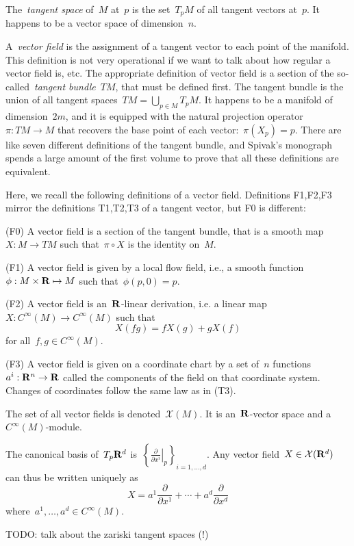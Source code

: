 The~\emph{tangent space} of~$M$ at~$p$ is the set~$T_pM$ of all tangent
vectors at~$p$.  It happens to be a vector space of dimension~$n$.

A~\emph{vector field} is the assignment of a tangent vector to each point of
the manifold.  This definition is not very operational if we want to talk
about how regular a vector field is, etc.  The appropriate definition of
vector field is a section of the so-called~\emph{tangent bundle}~$TM$, that
must be defined first.  The tangent bundle is the union of all tangent
spaces~$TM=\bigcup_{p\in M}T_pM$.  It happens to be a manifold of
dimension~$2m$, and it is equipped with the natural projection
operator~$\pi:TM\to M$ that recovers the base point of each
vector:~$\pi\left(X_p\right)=p$.  There are like seven different definitions
of the tangent bundle, and Spivak's monograph spends a large amount of the
first volume to prove that all these definitions are equivalent.

Here, we recall the following definitions of a vector field.  Definitions
F1,F2,F3 mirror the definitions T1,T2,T3 of a tangent vector, but F0 is
different:

(F0) A vector field is a section of the tangent bundle, that is a
smooth map~$X:M\to TM$ such that~$\pi\circ X$ is the identity on~$M$.

(F1) A vector field is given by a local flow field, i.e., a smooth
function~$\phi:M\times\mathbf{R}\mapsto M$ such that~$\phi(p,0)=p$.

(F2) A vector field is an~$\mathbf{R}$-linear derivation, i.e. a linear
map~$X:C^\infty(M)\to C^\infty(M)$ such that
\[
	X(fg)=fX(g)+gX(f)
\]
for all~$f,g\in C^\infty(M)$.

(F3) A vector field is given on a coordinate chart by a set of~$n$
functions~$a^i:\mathbf{R}^n\to\mathbf{R}$ called the components of the field on that
coordinate system.  Changes of coordinates follow the same law as in (T3).

The set of all vector fields is denoted~$\mathcal{X}(M)$.
It is an~$\mathbf{R}$-vector space and a~$C^\infty(M)$-module.

The canonical basis of~$T_p\mathbf{R}^d$
is~$\displaystyle\left\{\left.\frac{\partial}{\partial
	x^i}\right|_p\right\}_{i=1,\ldots,d}$.  Any vector
	field~$X\in\mathcal{X}(\mathbf{R}^d)$ can thus be written uniquely as
\[
	X =
	a^1\frac{\partial}{\partial x^1}
	+\cdots+
	a^d\frac{\partial}{\partial x^d}
\]
where~$a^1,\ldots,a^d\in C^\infty(M)$.

TODO: talk about the zariski tangent spaces (!)

